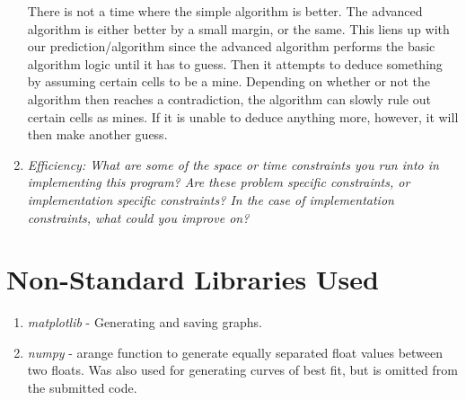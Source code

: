 \documentclass[12pt, twoside]{article}
\begin{document}
\begin{enumerate}[itemsep=2mm,parsep=4mm]
        There is not a time where the simple algorithm is better. The advanced algorithm is either better by a small margin, or the same. This liens up with our prediction/algorithm since the advanced algorithm performs the basic algorithm logic until it has to guess. Then it attempts to deduce something by assuming certain cells to be a mine. Depending on whether or not the algorithm then reaches a contradiction, the algorithm can slowly rule out certain cells as mines. If it is unable to deduce anything more, however, it will then make another guess.
    \item 
        \textit{Efficiency: What are some of the space or time constraints you run into in implementing this program? Are these problem specific constraints, or implementation specific constraints? In the case of implementation constraints, what could you improve on?}

\end{enumerate}
 
\vfill
\pagebreak
\section{Non-Standard Libraries Used}

\begin{enumerate}
    \item
        \textit{matplotlib} - Generating and saving graphs.
    \item
        \textit{numpy} - arange function to generate equally separated float values between two floats.
        Was also used for generating curves of best fit, but is omitted from the submitted code.
\end{enumerate}
 
\end{document}
